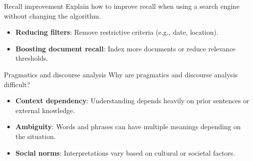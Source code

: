\documentclass{article}
\begin{document}
\begin{exercise}{Recall improvement}
  Explain how to improve recall when using a search engine without changing the algorithm.

  \begin{solution}
    \begin{itemize}
        \item \textbf{Reducing filters}: Remove restrictive criteria (e.g., date, location).
        \item \textbf{Boosting document recall}: Index more documents or reduce relevance thresholds.

    \end{itemize}
  \end{solution}
\end{exercise}

\begin{exercise}{Pragmatics and discourse analysis}\label{ex:pragmatics}
  Why are pragmatics and discourse analysis difficult?

  \begin{solution}
    \begin{itemize}
      \item \textbf{Context dependency}: Understanding depends heavily on prior sentences or external knowledge.
      \item \textbf{Ambiguity}: Words and phrases can have multiple meanings depending on the situation.
      \item \textbf{Social norms}: Interpretations vary based on cultural or societal factors.
    \end{itemize}
  \end{solution}
\end{exercise}
\end{document}
